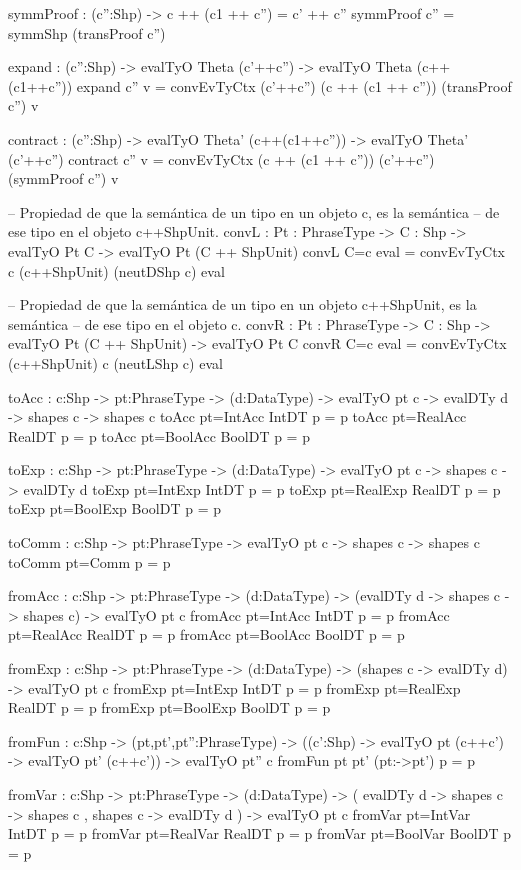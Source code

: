 \begin{code}
        symmProof : (c'':Shp) -> c ++ (c1 ++ c'') = c' ++ c''
        symmProof c'' = symmShp (transProof c'')
        
        expand : (c'':Shp) -> evalTyO Theta (c'++c'') -> evalTyO Theta (c++(c1++c''))
        expand c'' v = convEvTyCtx (c'++c'') (c ++ (c1 ++ c'')) (transProof c'') v
        
           contract : (c'':Shp) -> evalTyO Theta' (c++(c1++c'')) -> evalTyO Theta' (c'++c'')
        contract c'' v = convEvTyCtx (c ++ (c1 ++ c'')) (c'++c'') (symmProof c'') v

-- Propiedad de que la semántica de un tipo en un objeto c, es la semántica
-- de ese tipo en el objeto c++ShpUnit.
convL : {Pt : PhraseType} -> {C : Shp} -> evalTyO Pt C -> evalTyO Pt (C ++ ShpUnit)
convL {C=c} eval = convEvTyCtx c (c++ShpUnit) (neutDShp c) eval

-- Propiedad de que la semántica de un tipo en un objeto c++ShpUnit, es la semántica
-- de ese tipo en el objeto c.
convR : {Pt : PhraseType} -> {C : Shp} -> evalTyO Pt (C ++ ShpUnit) -> evalTyO Pt C
convR {C=c} eval = convEvTyCtx (c++ShpUnit) c (neutLShp c) eval

toAcc : {c:Shp} -> {pt:PhraseType} -> 
        (d:DataType) -> evalTyO pt c -> evalDTy d -> shapes c -> shapes c
toAcc {pt=IntAcc}  IntDT  p = p
toAcc {pt=RealAcc} RealDT p = p
toAcc {pt=BoolAcc} BoolDT p = p

toExp : {c:Shp} -> {pt:PhraseType} -> 
        (d:DataType) -> evalTyO pt c -> shapes c -> evalDTy d
toExp {pt=IntExp}  IntDT  p = p
toExp {pt=RealExp} RealDT p = p
toExp {pt=BoolExp} BoolDT p = p

toComm : {c:Shp} -> {pt:PhraseType} -> evalTyO pt c -> shapes c -> shapes c
toComm {pt=Comm} p = p

fromAcc : {c:Shp} -> {pt:PhraseType} -> 
          (d:DataType) -> (evalDTy d -> shapes c -> shapes c) -> evalTyO pt c
fromAcc {pt=IntAcc}  IntDT  p = p
fromAcc {pt=RealAcc} RealDT p = p
fromAcc {pt=BoolAcc} BoolDT p = p

fromExp : {c:Shp} -> {pt:PhraseType} -> 
        (d:DataType) -> (shapes c -> evalDTy d) -> evalTyO pt c
fromExp {pt=IntExp}  IntDT  p = p
fromExp {pt=RealExp} RealDT p = p
fromExp {pt=BoolExp} BoolDT p = p

fromFun : {c:Shp} -> (pt,pt',pt'':PhraseType) -> 
          ((c':Shp) -> evalTyO pt (c++c') -> evalTyO pt' (c++c')) -> evalTyO pt'' c
fromFun pt pt' (pt:->pt') p = p

fromVar : {c:Shp} -> {pt:PhraseType} -> 
        (d:DataType) -> ( evalDTy d -> shapes c -> shapes c
                        , shapes c -> evalDTy d
                        ) -> evalTyO pt c
fromVar {pt=IntVar}  IntDT  p = p
fromVar {pt=RealVar} RealDT p = p
fromVar {pt=BoolVar} BoolDT p = p
\end{code}

